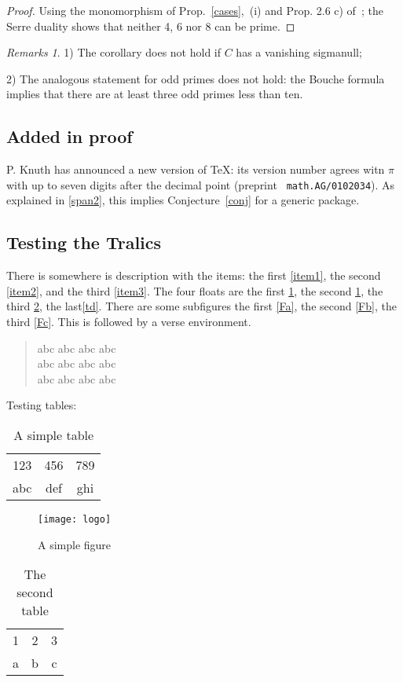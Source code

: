 \documentclass{amsart}
\numberwithin{equation}{section}
\theoremstyle{plain}
\theoremstyle{remark}
\newtheorem{remas}[subsection]{Remarks}%
\begin{document}
\begin{proof} 
Using the monomorphism of Prop.~\ref{cases},~(i) 
and Prop. 2.6 c) of~\cite{B1}; the  Serre duality shows that neither 4, 6 nor
8 can be prime.
\end{proof} 

\begin{remas}

1) The corollary does not hold if $C$ has a vanishing
sigmanull;

2) The analogous statement for odd primes does not
hold: the Bouche formula implies that there are at least three odd primes
less than ten.

\end{remas}

\subsection{Added in proof}
P. Knuth  has announced a new version of \TeX: its version number agrees witn
$\pi$ with up to seven digits after the
decimal point (preprint {\tt
  math.AG/0102034}). As explained in \ref{span2}, this implies
Conjecture~\ref{conj} for a generic package.

\subsection{Testing the Tralics}
There is somewhere is description with the items:
the first \ref{item1}, the second \ref{item2}, and the third \ref{item3}.
The four floats are
the first \ref{ta}, the second \ref{tb}, the third \ref{tc}, the last\ref{td}.
There are some subfigures
the first \ref{Fa}, the second \ref{Fb}, the third \ref{Fc}.
This is followed by a verse environment.

\begin{verse}
abc abc abc abc\\
abc abc abc abc\\
abc abc abc abc\\
\end{verse}


Testing tables:
\begin{table}
\caption{A simple table}
\begin{tabular}{ccc}123&456&789\\ abc&def&ghi\end{tabular}\label{ta}
\end{table}
\begin{figure}
\texttt{[image: logo]}
\caption{A simple figure}
\label{tb}
\end{figure}
\begin{table}
\caption{The second table}
\begin{tabular}{ccc}1&2&3\\a&b&c\end{tabular}\label{tc}
\end{table}
\def\logo{\texttt{[image: logo]}}
\end{document}
